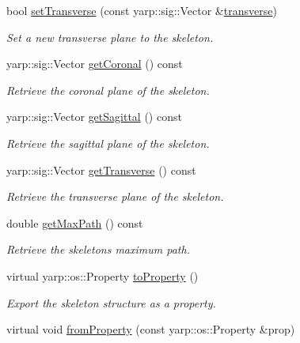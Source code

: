 \begin{DoxyCompactItemize}
bool \mbox{\hyperlink{classassistive__rehab_1_1Skeleton_a1aeba05a17363afc08c30397d17375df}{set\+Transverse}} (const yarp\+::sig\+::\+Vector \&\mbox{\hyperlink{classassistive__rehab_1_1Skeleton_ab8a9bf9297f520e8de801248e0b8d2dd}{transverse}})
\begin{DoxyCompactList}\small\item\em Set a new transverse plane to the skeleton. \end{DoxyCompactList}\item 
yarp\+::sig\+::\+Vector \mbox{\hyperlink{classassistive__rehab_1_1Skeleton_aa241a0ac93a9ead198f985073c8935eb}{get\+Coronal}} () const
\begin{DoxyCompactList}\small\item\em Retrieve the coronal plane of the skeleton. \end{DoxyCompactList}\item 
yarp\+::sig\+::\+Vector \mbox{\hyperlink{classassistive__rehab_1_1Skeleton_a83133fabc903ddd4e54edf59df977167}{get\+Sagittal}} () const
\begin{DoxyCompactList}\small\item\em Retrieve the sagittal plane of the skeleton. \end{DoxyCompactList}\item 
yarp\+::sig\+::\+Vector \mbox{\hyperlink{classassistive__rehab_1_1Skeleton_a35c3cdea575eb474a2cb8e0186011cff}{get\+Transverse}} () const
\begin{DoxyCompactList}\small\item\em Retrieve the transverse plane of the skeleton. \end{DoxyCompactList}\item 
double \mbox{\hyperlink{classassistive__rehab_1_1Skeleton_acda9030cd2ed3ad92697418a5e2cff7c}{get\+Max\+Path}} () const
\begin{DoxyCompactList}\small\item\em Retrieve the skeleton\textquotesingle{}s maximum path. \end{DoxyCompactList}\item 
virtual yarp\+::os\+::\+Property \mbox{\hyperlink{classassistive__rehab_1_1Skeleton_ad58ea53a165abc3f39a3c46594f0560f}{to\+Property}} ()
\begin{DoxyCompactList}\small\item\em Export the skeleton structure as a property. \end{DoxyCompactList}\item 
virtual void \mbox{\hyperlink{classassistive__rehab_1_1Skeleton_ac844f66503de87859833056dc33a835b}{from\+Property}} (const yarp\+::os\+::\+Property \&prop)

\end{DoxyCompactItemize}
